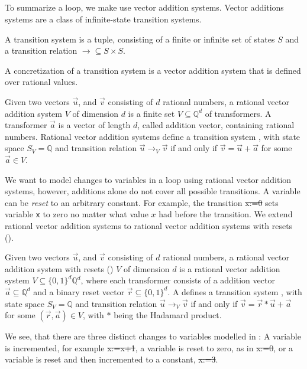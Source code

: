 \subsection{\qvasr}
To summarize a loop, we make use vector addition systems. Vector additions systems are a class of infinite-state transition systems.

\begin{mydef}
	A transition system \transSys{} is a tuple, consisting of a finite or infinite set of states $S$ and a transition relation $\rightarrow \subseteq S \times S$.
\end{mydef}

A concretization of a transition system is a vector addition system that is defined over rational values.

\begin{mydef}
	Given two vectors $\vec{u}$, and $\vec{v}$ consisting of $d$ rational numbers, a rational vector addition system $V$ of dimension $d$ is a finite set $V \subseteq \mathbb{Q}^d$ of transformers. A transformer $\vec{a}$ is a vector of length $d$, called addition vector, containing rational numbers. Rational vector addition systems define a transition system , with state space $S_V = \mathbb{Q}$ and transition relation $\vec{u} \rightarrow_V \vec{v}$ if and only if $\vec{v} = \vec{u} + \vec{a}$ for some $\vec{a} \in V$. 
\end{mydef}
We want to model changes to variables in a loop using rational vector addition systems, however, additions alone do not cover all possible transitions. A variable can be \textsl{reset} to an arbitrary constant. For example, the transition \st{x:=0} sets variable \texttt{x} to zero no matter what value $x$ had before the transition. We extend rational vector addition systems to rational vector addition systems with resets (\qvasr).

\begin{mydef}
		Given two vectors $\vec{u}$, and $\vec{v}$ consisting of $d$ rational numbers, a rational vector addition system with resets (\qvasr) $V$ of dimension $d$ is a rational vector addition system $V \subseteq \{0, 1\}^d \mathbb{Q}^d$, where each transformer consists of a addition vector $\vec{a} \subseteq \mathbb{Q}^d$ and a binary reset vector $\vec{r} \subseteq \{0, 1\}^d$. A \qvasr defines a transition system , with state space $S_V = \mathbb{Q}$ and transition relation $\vec{u} \rightarrow_V \vec{v}$ if and only if $\vec{v} = \vec{r} * \vec{u} + \vec{a}$ for some $(\vec{r}, \vec{a}) \in V$, with $*$ being the Hadamard product.
\end{mydef}
We see, that there are three distinct changes to variables modelled in \qvasr: A variable is incremented, for example \st{x:=x+1}, a variable is reset to zero, as in \st{x:=0}, or a variable is reset and then incremented to a constant, \st{x:=3}. \par

